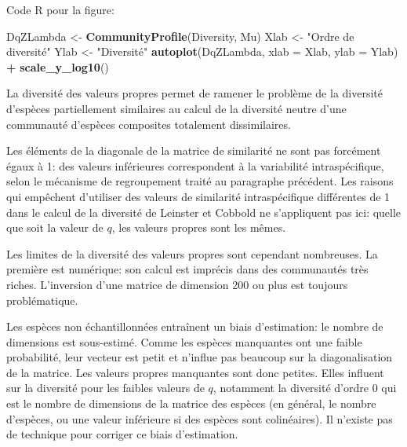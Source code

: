 \documentclass[
  11pt,
  french,
  a4paper,
  extrafontsizes,onecolumn,openright
  ]{memoir}
\newenvironment{Shaded}{\begin{snugshade}}{\end{snugshade}}
\newcommand{\AttributeTok}[1]{\textcolor[rgb]{0.13,0.29,0.53}{#1}}
\newcommand{\FunctionTok}[1]{\textcolor[rgb]{0.13,0.29,0.53}{\textbf{#1}}}
\newcommand{\NormalTok}[1]{#1}
\newcommand{\OtherTok}[1]{\textcolor[rgb]{0.56,0.35,0.01}{#1}}
\newcommand{\SpecialCharTok}[1]{\textcolor[rgb]{0.81,0.36,0.00}{\textbf{#1}}}
\newcommand{\StringTok}[1]{\textcolor[rgb]{0.31,0.60,0.02}{#1}}
\begin{document}
\normalsize

Code R pour la figure:

\scriptsize

\begin{Shaded}
\begin{Highlighting}[]
\NormalTok{DqZLambda }\OtherTok{\textless{}{-}} \FunctionTok{CommunityProfile}\NormalTok{(Diversity, Mu)}
\NormalTok{Xlab }\OtherTok{\textless{}{-}} \StringTok{"Ordre de diversité"}
\NormalTok{Ylab }\OtherTok{\textless{}{-}} \StringTok{"Diversité"}
\FunctionTok{autoplot}\NormalTok{(DqZLambda, }\AttributeTok{xlab =}\NormalTok{ Xlab, }\AttributeTok{ylab =}\NormalTok{ Ylab) }\SpecialCharTok{+} \FunctionTok{scale\_y\_log10}\NormalTok{()}
\end{Highlighting}
\end{Shaded}

\normalsize

La diversité des valeurs propres permet de ramener le problème de la diversité d'espèces partiellement similaires au calcul de la diversité neutre d'une communauté d'espèces composites totalement dissimilaires.

Les éléments de la diagonale de la matrice de similarité ne sont pas forcément égaux à 1: des valeurs inférieures correspondent à la variabilité intraspécifique, selon le mécanisme de regroupement traité au paragraphe précédent.
Les raisons qui empêchent d'utiliser des valeurs de similarité intraspécifique différentes de 1 dans le calcul de la diversité de Leinster et Cobbold ne s'appliquent pas ici: quelle que soit la valeur de \(q\), les valeurs propres sont les mêmes.

Les limites de la diversité des valeurs propres sont cependant nombreuses.
La première est numérique: son calcul est imprécis dans des communautés très riches.
L'inversion d'une matrice de dimension 200 ou plus est toujours problématique.

Les espèces non échantillonnées entraînent un biais d'estimation: le nombre de dimensions est sous-estimé.
Comme les espèces manquantes ont une faible probabilité, leur vecteur est petit et n'influe pas beaucoup sur la diagonalisation de la matrice.
Les valeurs propres manquantes sont donc petites.
Elles influent sur la diversité pour les faibles valeurs de \(q\), notamment la diversité d'ordre 0 qui est le nombre de dimensions de la matrice des espèces (en général, le nombre d'espèces, ou une valeur inférieure si des espèces sont colinéaires).
Il n'existe pas de technique pour corriger ce biais d'estimation.
\end{document}
